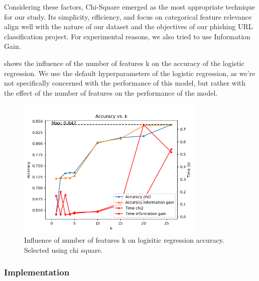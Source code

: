 \documentclass{article}
\begin{document}
    Considering these factors, Chi-Square emerged as the most appropriate technique for our study.
    Its simplicity, efficiency, and focus on categorical feature relevance align well with the nature of our dataset and the objectives of our phishing URL classification project.
    For experimental reasons, we also tried to use Information Gain.

     shows the influence of the number of features k on the accuracy of the logistic regression. We use the default hyperparameters of the logistic regression, as we're not specifically concerned with the performance of this model, but rather with the effect of the number of features on the performance of the model.


    \begin{figure}[H]
        \centering
        \includegraphics[width=0.8\textwidth]{report_img/k_search/logistic_regression}
        \caption{Influence of number of features k on logisitic regression accuracy. Selected using chi square.}
        \label{fig:k_search_logistic_regression}
    \end{figure}

    \subsubsection{Implementation}\label{subsubsec:implementation}

\end{document}
